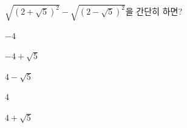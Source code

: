 $\sqrt{(2+\sqrt{5})^2}-\sqrt{(2-\sqrt{5})^2}$을 간단히 하면?
\begin{choices32}{\rule[-3ex]{0pt}{8ex}$-4$}{\rule[-3ex]{0pt}{8ex}$-4+\sqrt{5}$}{\rule[-3ex]{0pt}{8ex}$4-\sqrt{5}$}{\rule[-3ex]{0pt}{8ex}$4$}{\rule[-3ex]{0pt}{8ex}$4+\sqrt{5}$}\end{choices32}
